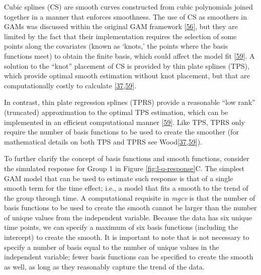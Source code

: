 \documentclass[
]{article}
\begin{document}
Cubic splines (CS) are smooth curves constructed from cubic polynomials joined together in a manner that enforces smoothness. The use of CS as smoothers in GAMs was discussed within the original GAM framework {[}\protect\hyperlink{ref-hastie1987}{56}{]}, but they are limited by the fact that their implementation requires the selection of some points along the covariates (known as `knots,' the points where the basis functions meet) to obtain the finite basis, which could affect the model fit {[}\protect\hyperlink{ref-wood2003}{59}{]}. A solution to the ``knot'' placement of CS is provided by thin plate splines (TPS), which provide optimal smooth estimation without knot placement, but that are computationally costly to calculate {[}\protect\hyperlink{ref-wood2017}{37},\protect\hyperlink{ref-wood2003}{59}{]}.

In contrast, thin plate regression splines (TPRS) provide a reasonable ``low rank'' (truncated) approximation to the optimal TPS estimation, which can be implemented in an efficient computational manner {[}\protect\hyperlink{ref-wood2003}{59}{]}. Like TPS, TPRS only require the number of basis functions to be used to create the smoother (for mathematical details on both TPS and TPRS see Wood{[}\protect\hyperlink{ref-wood2017}{37},\protect\hyperlink{ref-wood2003}{59}{]}).

To further clarify the concept of basis functions and smooth functions, consider the simulated response for Group 1 in Figure \ref{fig:l-q-response}C. The simplest GAM model that can be used to estimate such response is that of a single smooth term for the time effect; i.e., a model that fits a smooth to the trend of the group through time. A computational requisite in \emph{mgcv} is that the number of basis functions to be used to create the smooth cannot be larger than the number of unique values from the independent variable. Because the data has six unique time points, we can specify a maximum of six basis functions (including the intercept) to create the smooth. It is important to note that is not necessary to specify a number of basis equal to the number of unique values in the independent variable; fewer basis functions can be specified to create the smooth as well, as long as they reasonably capture the trend of the data.
\end{document}
